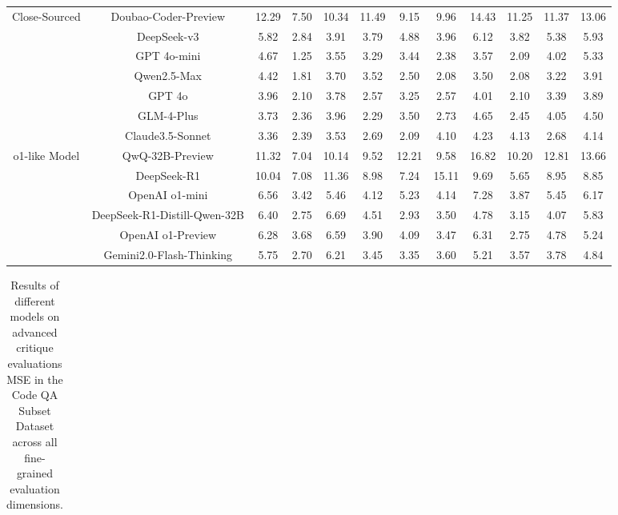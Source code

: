 \documentclass[11pt, a4paper, logo, copyright, nonumbering, amsart]{map}
\begin{document}
\begin{CJK*}{UTF8}{gbsn}
\begin{table*}[h!]
\begin{adjustbox}{width=\textwidth}
\begin{tabular}{c|c|cccccccccc}
    \midrule
    \multirow{7}{*}{Close-Sourced} 
    & Doubao-Coder-Preview & 12.29 & 7.50 & 10.34 & 11.49 & 9.15 & 9.96 & 14.43 & 11.25 & 11.37 & 13.06 \\
    & DeepSeek-v3 & 5.82 & 2.84 & 3.91 & 3.79 & 4.88 & 3.96 & 6.12 & 3.82 & 5.38 & 5.93 \\
    & GPT 4o-mini & 4.67 & 1.25 & 3.55 & 3.29 & 3.44 & 2.38 & 3.57 & 2.09 & 4.02 & 5.33 \\
    & Qwen2.5-Max & 4.42 & 1.81 & 3.70 & 3.52 & 2.50 & 2.08 & 3.50 & 2.08 & 3.22 & 3.91 \\
    & GPT 4o & 3.96 & 2.10 & 3.78 & 2.57 & 3.25 & 2.57 & 4.01 & 2.10 & 3.39 & 3.89 \\
    & GLM-4-Plus & 3.73 & 2.36 & 3.96 & 2.29 & 3.50 & 2.73 & 4.65 & 2.45 & 4.05 & 4.50 \\
    & Claude3.5-Sonnet & 3.36 & 2.39 & 3.53 & 2.69 & 2.09 & 4.10 & 4.23 & 4.13 & 2.68 & 4.14 \\

    \midrule
    \multirow{6}{*}{o1-like Model} 
    & QwQ-32B-Preview & 11.32 & 7.04 & 10.14 & 9.52 & 12.21 & 9.58 & 16.82 & 10.20 & 12.81 & 13.66 \\
    & DeepSeek-R1 & 10.04 & 7.08 & 11.36 & 8.98 & 7.24 & 15.11 & 9.69 & 5.65 & 8.95 & 8.85 \\
    & OpenAI o1-mini & 6.56 & 3.42 & 5.46 & 4.12 & 5.23 & 4.14 & 7.28 & 3.87 & 5.45 & 6.17 \\
    & DeepSeek-R1-Distill-Qwen-32B & 6.40 & 2.75 & 6.69 & 4.51 & 2.93 & 3.50 & 4.78 & 3.15 & 4.07 & 5.83 \\
    & OpenAI o1-Preview & 6.28 & 3.68 & 6.59 & 3.90 & 4.09 & 3.47 & 6.31 & 2.75 & 4.78 & 5.24 \\
    & Gemini2.0-Flash-Thinking & 5.75 & 2.70 & 6.21 & 3.45 & 3.35 & 3.60 & 5.21 & 3.57 & 3.78 & 4.84 \\
    \bottomrule
    \end{tabular}
    \end{adjustbox}
\end{table*}

\begin{table*}[h!]
    \centering
    \caption{Results of different models on advanced critique evaluations MSE in the Code QA Subset Dataset across all fine-grained evaluation dimensions.} \label{table:real_level2_all_dim}
    \begin{adjustbox}{width=\textwidth}
    \begin{tabular}{c|c|cccccccccc}
    

\end{tabular}
\end{adjustbox}
\end{table*}
\end{CJK*}
\end{document}
